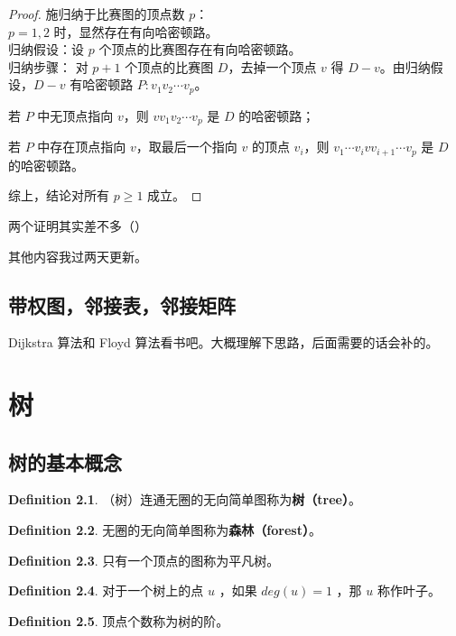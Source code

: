 \documentclass[oneside]{book}
\theoremstyle{definition}
\newtheorem{definition}{Definition}[section]
\begin{document}
\begin{proof}
	施归纳于比赛图的顶点数 \( p \)：\\
    \( p=1,2 \) 时，显然存在有向哈密顿路。\\
	归纳假设：设 \( p \) 个顶点的比赛图存在有向哈密顿路。\\
	归纳步骤：
	对 \( p+1 \) 个顶点的比赛图 \( D \)，去掉一个顶点 \( v \) 得 \( D-v \)。由归纳假设，\( D-v \) 有哈密顿路 \( P: v_1v_2\cdots v_p \)。
	
	若 \( P \) 中无顶点指向 \( v \)，则 \( vv_1v_2\cdots v_p \) 是 \( D \) 的哈密顿路；
	
	若 \( P \) 中存在顶点指向 \( v \)，取最后一个指向 \( v \) 的顶点 \( v_i \)，则 \( v_1\cdots v_ivv_{i+1}\cdots v_p \) 是 \( D \) 的哈密顿路。
	
	综上，结论对所有 \( p \geq 1 \) 成立。
\end{proof}

两个证明其实差不多（）


其他内容我过两天更新。

\section{带权图，邻接表，邻接矩阵}
Dijkstra 算法和 Floyd 算法看书吧。大概理解下思路，后面需要的话会补的。





\chapter{树}
\section{树的基本概念}

\begin{definition}
	（树）连通无圈的无向简单图称为\textbf{树（tree）}。
\end{definition}

\begin{definition}
	无圈的无向简单图称为\textbf{森林（forest）}。
\end{definition}

\begin{definition}
	只有一个顶点的图称为平凡树。
\end{definition}

\begin{definition}
	对于一个树上的点 \(u\) ，如果 \(deg(u)=1\) ，那 \(u\) 称作叶子。 
\end{definition}
\begin{definition}
	顶点个数称为树的阶。
\end{definition}
\end{document}
